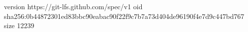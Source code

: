 version https://git-lfs.github.com/spec/v1
oid sha256:0b44872301ed83bbc90eabac90f22f9c7b7a73d404de96190f4e7d9c447bd767
size 12239
